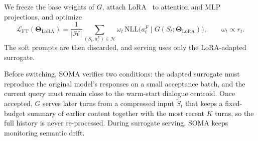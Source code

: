 We freeze the base weights of $G$, attach LoRA~\citep{hu2022lora} to attention and MLP projections, and optimize 
\begin{equation}
\label{eq:lora-ft}
\mathcal L_{\mathrm{FT}}(\boldsymbol\Theta_{\mathrm{LoRA}})=
\frac{1}{|\mathcal H|}\sum_{(S_t,a_t^F)\in\mathcal H}
\omega_t\,\mathrm{NLL}\big(a_t^F\mid G(S_t;\boldsymbol\Theta_{\mathrm{LoRA}})\big),
\qquad
\omega_t\propto r_t .
\end{equation}
The soft prompts are then discarded, and serving uses only the LoRA-adapted surrogate.

Before switching, SOMA verifies two conditions: the adapted surrogate must reproduce the original model's responses on a small acceptance batch, and the current query must remain close to the warm-start dialogue centroid. Once accepted, \(G\) serves later turns from a compressed input \(\widetilde S_t\) that keeps a fixed-budget summary of earlier content together with the most recent \(K\) turns, so the full history is never re-processed. During surrogate serving, SOMA keeps monitoring semantic drift.  